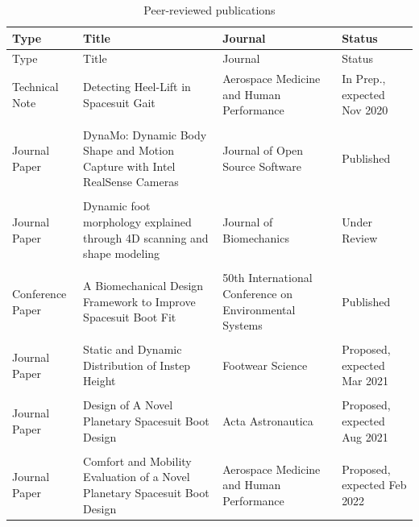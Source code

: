 \documentclass[defaultstyle,11pt]{comps}
\begin{document}
\pagebreak

\hypertarget{tbl:pubs}{}
\begin{longtable}[]{@{}
  >{\raggedright\arraybackslash}p{}
  >{\raggedright\arraybackslash}p{}
  >{\raggedright\arraybackslash}p{}
  >{\raggedright\arraybackslash}p{}@{}}
\caption{\label{tbl:pubs}Peer-reviewed publications}\tabularnewline
\toprule
Type & Title & Journal & Status \\
\midrule
\endfirsthead
\toprule
Type & Title & Journal & Status \\
\midrule
\endhead
Technical Note & Detecting Heel-Lift in Spacesuit Gait & Aerospace Medicine and Human Performance & In Prep., expected Nov 2020 \\
& & & \\
Journal Paper & DynaMo: Dynamic Body Shape and Motion Capture with Intel RealSense Cameras & Journal of Open Source Software & Published \\
& & & \\
Journal Paper & Dynamic foot morphology explained through 4D scanning and shape modeling & Journal of Biomechanics & Under Review \\
& & & \\
Conference Paper & A Biomechanical Design Framework to Improve Spacesuit Boot Fit & 50th International Conference on Environmental Systems & Published \\
& & & \\
Journal Paper & Static and Dynamic Distribution of Instep Height & Footwear Science & Proposed, expected Mar 2021 \\
& & & \\
Journal Paper & Design of A Novel Planetary Spacesuit Boot Design & Acta Astronautica & Proposed, expected Aug 2021 \\
& & & \\
Journal Paper & Comfort and Mobility Evaluation of a Novel Planetary Spacesuit Boot Design & Aerospace Medicine and Human Performance & Proposed, expected Feb 2022 \\
\bottomrule
\end{longtable}

\pagebreak
\end{document}
